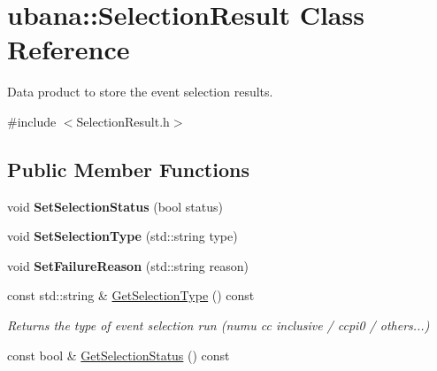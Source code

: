 \hypertarget{classubana_1_1SelectionResult}{\section{ubana\-:\-:Selection\-Result Class Reference}
\label{classubana_1_1SelectionResult}
}


Data product to store the event selection results.  




{\ttfamily \#include $<$Selection\-Result.\-h$>$}

\subsection*{Public Member Functions}
\begin{DoxyCompactItemize}
\item 
\hypertarget{classubana_1_1SelectionResult_a1e042345d4fad423d897c944afb4a2c2}{void {\bfseries Set\-Selection\-Status} (bool status)}\label{classubana_1_1SelectionResult_a1e042345d4fad423d897c944afb4a2c2}

\item 
\hypertarget{classubana_1_1SelectionResult_a44cacfd834cb799f18938de7134c0086}{void {\bfseries Set\-Selection\-Type} (std\-::string type)}\label{classubana_1_1SelectionResult_a44cacfd834cb799f18938de7134c0086}

\item 
\hypertarget{classubana_1_1SelectionResult_ab7053b38033e245ffa2c9ad3c6a4b3dc}{void {\bfseries Set\-Failure\-Reason} (std\-::string reason)}\label{classubana_1_1SelectionResult_ab7053b38033e245ffa2c9ad3c6a4b3dc}

\item 
\hypertarget{classubana_1_1SelectionResult_afcfc5b9afaf6e549117ae49bb9adfd1a}{const std\-::string \& \hyperlink{classubana_1_1SelectionResult_afcfc5b9afaf6e549117ae49bb9adfd1a}{Get\-Selection\-Type} () const }\label{classubana_1_1SelectionResult_afcfc5b9afaf6e549117ae49bb9adfd1a}

\begin{DoxyCompactList}\small\item\em Returns the type of event selection run (numu cc inclusive / ccpi0 / others...) \end{DoxyCompactList}\item 
\hypertarget{classubana_1_1SelectionResult_a776daea1e79f4b6978f0d4fd17a0a845}{const bool \& \hyperlink{classubana_1_1SelectionResult_a776daea1e79f4b6978f0d4fd17a0a845}{Get\-Selection\-Status} () const }\label{classubana_1_1SelectionResult_a776daea1e79f4b6978f0d4fd17a0a845}


\end{DoxyCompactItemize}
